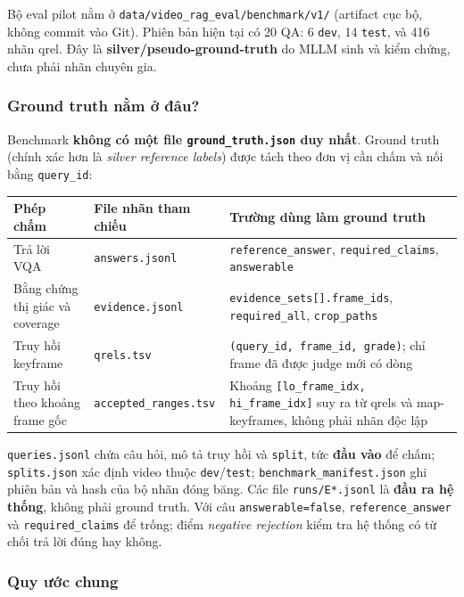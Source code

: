 \documentclass[12pt,a4paper,onecolumn]{article}
\begin{document}
Bộ eval pilot nằm ở \texttt{data/video\_rag\_eval/benchmark/v1/} (artifact cục bộ, không commit vào Git). Phiên bản hiện tại có 20 QA: 6 \texttt{dev}, 14 \texttt{test}, và 416 nhãn qrel. Đây là \textbf{silver/pseudo-ground-truth} do MLLM sinh và kiểm chứng, chưa phải nhãn chuyên gia.

\subsubsection{Ground truth nằm ở đâu?}

Benchmark \textbf{không có một file \texttt{ground\_truth.json} duy nhất}. Ground truth (chính xác hơn là \textit{silver reference labels}) được tách theo đơn vị cần chấm và nối bằng \texttt{query\_id}:

\noindent
\begin{tabularx}{\textwidth}{Y l Y}
\toprule
Phép chấm & File nhãn tham chiếu & Trường dùng làm ground truth \\
\midrule
Trả lời VQA & \texttt{answers.jsonl} & \texttt{reference\_answer}, \texttt{required\_claims}, \texttt{answerable} \\
Bằng chứng thị giác và coverage & \texttt{evidence.jsonl} & \texttt{evidence\_sets[].frame\_ids}, \texttt{required\_all}, \texttt{crop\_paths} \\
Truy hồi keyframe & \texttt{qrels.tsv} & \texttt{(query\_id, frame\_id, grade)}; chỉ frame đã được judge mới có dòng \\
Truy hồi theo khoảng frame gốc & \texttt{accepted\_ranges.tsv} & Khoảng \texttt{[lo\_frame\_idx, hi\_frame\_idx]} suy ra từ qrels và map-keyframes, không phải nhãn độc lập \\
\bottomrule
\end{tabularx}


\texttt{queries.jsonl} chứa câu hỏi, mô tả truy hồi và \texttt{split}, tức \textbf{đầu vào} để chấm; \texttt{splits.json} xác định video thuộc \texttt{dev}/\texttt{test}; \texttt{benchmark\_manifest.json} ghi phiên bản và hash của bộ nhãn đóng băng. Các file \texttt{runs/E*.jsonl} là \textbf{đầu ra hệ thống}, không phải ground truth. Với câu \texttt{answerable=false}, \texttt{reference\_answer} và \texttt{required\_claims} để trống; điểm \textit{negative rejection} kiểm tra hệ thống có từ chối trả lời đúng hay không.

\subsubsection{Quy ước chung}
\end{document}
